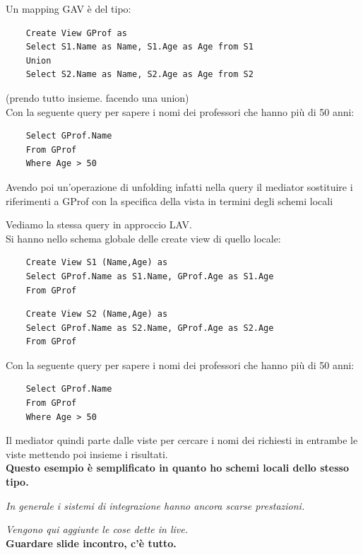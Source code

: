 \documentclass[a4paper,12pt, oneside]{book}
\begin{document}
\begin{esempio}
  Un mapping GAV è del tipo:
  \begin{verbatim}
    Create View GProf as
    Select S1.Name as Name, S1.Age as Age from S1
    Union
    Select S2.Name as Name, S2.Age as Age from S2
  \end{verbatim}
  (prendo tutto insieme. facendo una union)\\
  Con la seguente query per sapere i nomi dei professori che hanno più di 50
  anni:
  \begin{verbatim}
    Select GProf.Name
    From GProf
    Where Age > 50
  \end{verbatim}
  Avendo poi un'operazione di unfolding infatti nella query il mediator
  sostituire i riferimenti a GProf con la specifica della vista in termini degli
  schemi locali 
\end{esempio}
\begin{esempio}
  Vediamo la stessa query in approccio LAV.\\
  Si hanno nello schema globale delle create view di quello locale:
  \begin{verbatim}
    Create View S1 (Name,Age) as
    Select GProf.Name as S1.Name, GProf.Age as S1.Age
    From GProf
  \end{verbatim}
   \begin{verbatim}
    Create View S2 (Name,Age) as
    Select GProf.Name as S2.Name, GProf.Age as S2.Age
    From GProf
  \end{verbatim}
    Con la seguente query per sapere i nomi dei professori che hanno più di 50
  anni:
  \begin{verbatim}
    Select GProf.Name
    From GProf
    Where Age > 50
  \end{verbatim}
  Il mediator quindi parte dalle viste per cercare i nomi dei richiesti in
  entrambe le viste mettendo poi insieme i risultati.\\
  \textbf{Questo esempio è semplificato in quanto ho schemi locali dello stesso
    tipo.}
\end{esempio}
\textit{In generale i sistemi di integrazione hanno ancora scarse prestazioni.}
\begin{shaded}
  \noindent
  \textit{Vengono qui aggiunte le cose dette in live.}\\
  \textbf{Guardare slide incontro, c'è tutto.}
\end{shaded}
\end{document}
